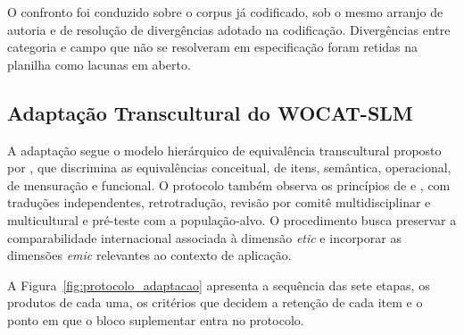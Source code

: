 \documentclass[preprint,authoryear,12pt]{elsarticle}
\begin{document}
O confronto foi conduzido sobre o corpus já codificado, sob o mesmo arranjo de autoria e de resolução de divergências adotado na codificação. Divergências entre categoria e campo que não se resolveram em especificação foram retidas na planilha como lacunas em aberto.

\subsection{Adaptação Transcultural do WOCAT-SLM}

A adaptação segue o modelo hierárquico de equivalência transcultural proposto por \citet{Herdman1999}, que discrimina as equivalências conceitual, de itens, semântica, operacional, de mensuração e funcional. O protocolo também observa os princípios de \citet{Guillemin1993} e \citet{Beaton2000}, com traduções independentes, retrotradução, revisão por comitê multidisciplinar e multicultural e pré-teste com a população-alvo. O procedimento busca preservar a comparabilidade internacional associada à dimensão \textit{etic} e incorporar as dimensões \textit{emic} relevantes ao contexto de aplicação.

A Figura~\ref{fig:protocolo_adaptacao} apresenta a sequência das sete etapas, os produtos de cada uma, os critérios que decidem a retenção de cada item e o ponto em que o bloco suplementar entra no protocolo.
\end{document}
